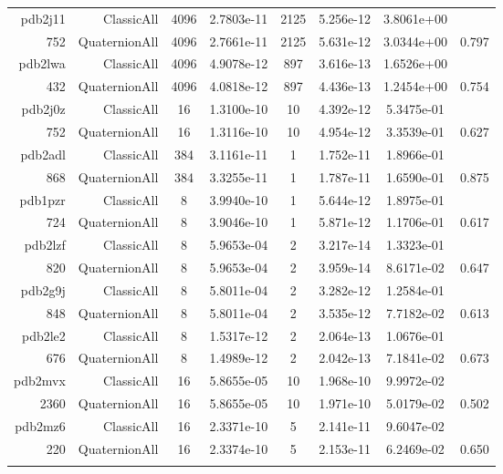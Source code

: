 \begin{xltabular}{\textwidth}{r|rcS[table-format=1.4e+2]cS[table-format=1.3e+2]S[table-format=1.4e+2]S[table-format=-1.3]}
{\color{red} pdb2j11 } & ClassicAll & 4096 & 2.7803e-11 & 2125 & 5.256e-12 & 3.8061e+00 & \\
752 & QuaternionAll & 4096 & 2.7661e-11 & 2125 & 5.631e-12 & 3.0344e+00 & 0.797\\  \addlinespace
{\color{red} pdb2lwa } & ClassicAll & 4096 & 4.9078e-12 & 897 & 3.616e-13 & 1.6526e+00 & \\
432 & QuaternionAll & 4096 & 4.0818e-12 & 897 & 4.436e-13 & 1.2454e+00 & 0.754\\  \addlinespace
pdb2j0z & ClassicAll & 16 & 1.3100e-10 & 10 & 4.392e-12 & 5.3475e-01 & \\
752 & QuaternionAll & 16 & 1.3116e-10 & 10 & 4.954e-12 & 3.3539e-01 & 0.627\\  \addlinespace
pdb2adl & ClassicAll & 384 & 3.1161e-11 & 1 & 1.752e-11 & 1.8966e-01 & \\
868 & QuaternionAll & 384 & 3.3255e-11 & 1 & 1.787e-11 & 1.6590e-01 & 0.875\\  \addlinespace
pdb1pzr & ClassicAll & 8 & 3.9940e-10 & 1 & 5.644e-12 & 1.8975e-01 & \\
724 & QuaternionAll & 8 & 3.9046e-10 & 1 & 5.871e-12 & 1.1706e-01 & 0.617\\  \addlinespace
pdb2lzf & ClassicAll & 8 & 5.9653e-04 & 2 & 3.217e-14 & 1.3323e-01 & \\
820 & QuaternionAll & 8 & 5.9653e-04 & 2 & 3.959e-14 & 8.6171e-02 & 0.647\\  \addlinespace
pdb2g9j & ClassicAll & 8 & 5.8011e-04 & 2 & 3.282e-12 & 1.2584e-01 & \\
848 & QuaternionAll & 8 & 5.8011e-04 & 2 & 3.535e-12 & 7.7182e-02 & 0.613\\  \addlinespace
pdb2le2 & ClassicAll & 8 & 1.5317e-12 & 2 & 2.064e-13 & 1.0676e-01 & \\
676 & QuaternionAll & 8 & 1.4989e-12 & 2 & 2.042e-13 & 7.1841e-02 & 0.673\\  \addlinespace
pdb2mvx & ClassicAll & 16 & 5.8655e-05 & 10 & 1.968e-10 & 9.9972e-02 & \\
2360 & QuaternionAll & 16 & 5.8655e-05 & 10 & 1.971e-10 & 5.0179e-02 & 0.502\\  \addlinespace
pdb2mz6 & ClassicAll & 16 & 2.3371e-10 & 5 & 2.141e-11 & 9.6047e-02 & \\
220 & QuaternionAll & 16 & 2.3374e-10 & 5 & 2.153e-11 & 6.2469e-02 & 0.650\\  \addlinespace

\end{xltabular}
